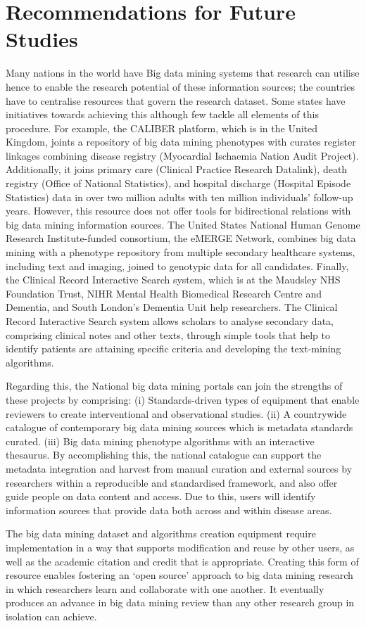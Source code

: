 \documentclass[sigconf]{acmart}
\begin{document}
\section{Recommendations for Future Studies}
Many nations in the world have Big data mining systems that research can utilise hence to enable the research potential of these information sources; the countries have to centralise resources that govern the research dataset. Some states have initiatives towards achieving this although few tackle all elements of this procedure. For example, the CALIBER platform, which is in the United Kingdom, joints a repository of big data mining phenotypes with curates register linkages combining disease registry (Myocardial Ischaemia Nation Audit Project). Additionally, it joins primary care (Clinical Practice Research Datalink), death registry (Office of National Statistics), and hospital discharge (Hospital Episode Statistics) data in over two million adults with ten million individuals’ follow-up years. However, this resource does not offer tools for bidirectional relations with big data mining information sources. The United States National Human Genome Research Institute-funded consortium, the eMERGE Network, combines big data mining with a phenotype repository from multiple secondary healthcare systems, including text and imaging, joined to genotypic data for all candidates. Finally, the Clinical Record Interactive Search system, which is at the Maudsley NHS Foundation Trust, NIHR Mental Health Biomedical Research Centre and Dementia, and South London's Dementia Unit help researchers. The Clinical Record Interactive Search system allows scholars to analyse secondary data, comprising clinical notes and other texts, through simple tools that help to identify patients are attaining specific criteria and developing the text-mining algorithms.
\par Regarding this, the National big data mining portals can join the strengths of these projects by comprising: (i) Standards-driven types of equipment that enable reviewers to create interventional and observational studies. (ii) A countrywide catalogue of contemporary big data mining sources which is metadata standards curated. (iii)  Big data mining phenotype algorithms with an interactive thesaurus. By accomplishing this, the national catalogue can support the metadata integration and harvest from manual curation and external sources by researchers within a reproducible and standardised framework, and also offer guide people on data content and access. Due to this, users will identify information sources that provide data both across and within disease areas.
\par The big data mining dataset and algorithms creation equipment require implementation in a way that supports modification and reuse by other users, as well as the academic citation and credit that is appropriate. Creating this form of resource enables fostering an ‘open source' approach to big data mining research in which researchers learn and collaborate with one another. It eventually produces an advance in big data mining review than any other research group in isolation can achieve.
\end{document}
